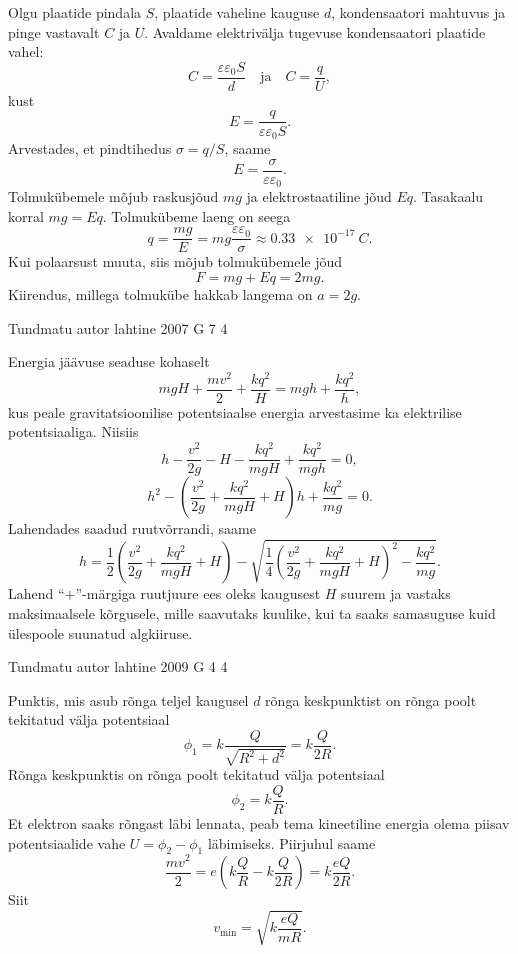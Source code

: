\documentclass[11pt, twoside]{article}
\begin{document}
{{\ifSolution
Olgu plaatide pindala $S$, plaatide vaheline kauguse $d$, kondensaatori mahtuvus ja pinge vastavalt $C$ ja $U$. Avaldame elektrivälja tugevuse kondensaatori plaatide vahel:
\[
C=\frac{\varepsilon \varepsilon_{0} S}{d} \quad \text{ja} \quad C=\frac{q}{U},
\]
kust
\[
E=\frac{q}{\varepsilon \varepsilon_{0} S}.
\]
Arvestades, et pindtihedus $\sigma = q/S$, saame
\[
E = \frac{\sigma}{\varepsilon\varepsilon_0}.
\]
Tolmukübemele mõjub raskusjõud $mg$ ja elektrostaatiline jõud $Eq$. Tasakaalu korral $mg = Eq$. Tolmukübeme laeng on seega
\[
q=\frac{m g}{E}=m g \frac{\varepsilon \varepsilon_{0}}{\sigma} \approx \SI{0,33e-17}{C}.
\]
Kui polaarsust muuta, siis mõjub tolmukübemele jõud
\[
F = mg + Eq = 2mg.
\]
Kiirendus, millega tolmukübe hakkab langema on $a = 2g$.
\fi
}

{Tundmatu autor} %
{lahtine} %
{2007} %
{G 7} %
{4} %
{

\ifSolution
Energia jäävuse seaduse kohaselt
\[
mgH + \frac{mv^2}{2} + \frac{kq^2}{H} = mgh + \frac{kq^2}{h},
\]
kus peale gravitatsioonilise potentsiaalse energia arvestasime ka elektrilise potentsiaaliga. Niisiis
\[
h-\frac{v^{2}}{2 g}-H-\frac{k q^{2}}{m g H}+\frac{k q^{2}}{m g h}=0,
\]
\[
h^{2}-\left(\frac{v^{2}}{2 g}+\frac{k q^{2}}{m g H}+H\right) h+\frac{k q^{2}}{m g}=0.
\]
Lahendades saadud ruutvõrrandi, saame
\[
h=\frac{1}{2}\left(\frac{v^{2}}{2 g}+\frac{k q^{2}}{m g H}+H\right)-\sqrt{\frac{1}{4}\left(\frac{v^{2}}{2 g}+\frac{k q^{2}}{m g H}+H\right)^{2}-\frac{k q^{2}}{m g}}.
\]
Lahend \enquote{$+$}-märgiga ruutjuure ees oleks kaugusest $H$ suurem ja vastaks maksimaalsele kõrgusele, mille saavutaks kuulike, kui ta saaks samasuguse kuid ülespoole suunatud algkiiruse.
\fi
}

{Tundmatu autor} %
{lahtine} %
{2009} %
{G 4} %
{4} %
{

\ifSolution
Punktis, mis asub rõnga teljel kaugusel $d$ rõnga keskpunktist on rõnga poolt tekitatud välja potentsiaal
\[
\phi_{1}=k \frac{Q}{\sqrt{R^{2}+d^{2}}}=k \frac{Q}{2 R}.
\]
Rõnga keskpunktis on rõnga poolt tekitatud välja potentsiaal
\[
\phi_{2}=k \frac{Q}{R}.
\]
Et elektron saaks rõngast läbi lennata, peab tema kineetiline energia olema piisav
potentsiaalide vahe $U = \phi_2 - \phi_1$ läbimiseks. Piirjuhul saame
\[
\frac{m v^{2}}{2}=e\left(k \frac{Q}{R}-k \frac{Q}{2 R}\right)=k \frac{e Q}{2 R}.
\]
Siit
\[
v_{\min }=\sqrt{k \frac{e Q}{m R}}.
\]
\fi
}

}
\end{document}

